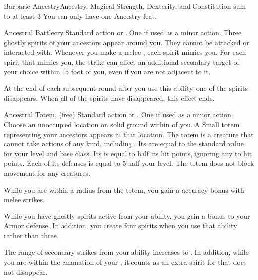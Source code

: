   \begin{magicalfeat}{Barbaric Ancestry}{Ancestry, Magical}
    \featpre Strength, Dexterity, and Constitution sum to at least 3
     You can only have one Ancestry feat.

    \begin{magicalactiveability}{Ancestral Battlecry}
      \abilityusagetime Standard action or .
      \abilitycost One  if used as a minor action.
      \rankline
      Three ghostly spirits of your ancestors appear around you.
      They cannot be attacked or interacted with.
      Whenever you make a melee , each spirit mimics you.
      For each spirit that mimics you, the strike can affect an additional secondary target of your choice within 15 foot  of you, even if you are not adjacent to it.

      At the end of each subsequent round after you use this ability, one of the spirits disappears.
      When all of the spirits have disappeared, this effect ends.
    \end{magicalactiveability}

    \begin{magicalsustainability}{Ancestral Totem}{,  (free)}
      \abilityusagetime Standard action or .
      \abilitycost One  if used as a minor action.
      \rankline
      Choose an unoccupied location on solid ground within \longrange of you.
      A Small totem representing your ancestors appears in that location.
      The totem is a creature that cannot take actions of any kind, including .
      Its  are equal to the standard value for your level and base class.
      Its  is equal to half its hit points, ignoring any  to hit points.
      Each of its defenses is equal to 5 \add half your level.
      The totem does not block movement for any creatures.

      While you are within a \medarea radius  from the totem, you gain a  accuracy bonus with melee strikes.
    \end{magicalsustainability}

     While you have ghostly spirits active from your  ability, you gain a  bonus to your Armor defense.
    In addition, you create four spirits when you use that ability rather than three.

     The range of secondary strikes from your  ability increases to \shortrange.
    In addition, while you are within the emanation of your , it counts as an extra spirit for  that does not disappear.
  \end{magicalfeat}

